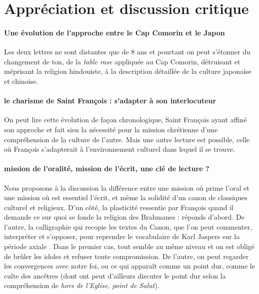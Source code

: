 \section{Appréciation et discussion critique}


\paragraph{Une évolution de l'approche entre le Cap Comorin et le Japon} Les deux lettres ne sont distantes que de 8 ans et pourtant on peut s'étonner du changement de ton, de la \textit{table rase} appliquée au Cap Comorin, détruisant et méprisant la religion hindouiste, à la description détaillée de la culture japonaise et chinoise.  

\paragraph{le charisme de Saint François : s'adapter à son interlocuteur} On peut lire cette évolution de façon chronologique, Saint François ayant affiné son approche et fait sien la nécessité pour la mission chrétienne d'une compréhension de la culture de l'autre. 
Mais une autre lecture est possible, celle où François s'adapterait à l'environnement culturel dans lequel il se trouve.

\paragraph{mission de l'oralité, mission de l'écrit, une clé de lecture ?} Nous proposons à la discussion la différence entre une mission  où prime l'oral et une mission où est essentiel l'écrit, et même la solidité d'un canon de classiques culturel et religieux. D'un côté, la plasticité ressentie par François quand il demande ce sur quoi se fonde la religion des Brahmanes : réponds d'abord.
De l'autre, la calligraphie qui recopie les textes du Canon, que l'on peut commenter, interpréter et s'opposer, pour reprendre le vocabulaire de Karl Jaspers sur la période axiale . Dans le premier cas, tout semble au même niveau et on est obligé de brûler les idoles et refuser toute compromission. De l'autre, on peut regarder les convergences avec notre foi, ou ce qui apparaît comme un point dur, comme le culte des ancêtres (dont ont peut d'ailleurs discuter le point dur selon la compréhension de \textit{hors de l'Eglise, point de Salut}).

